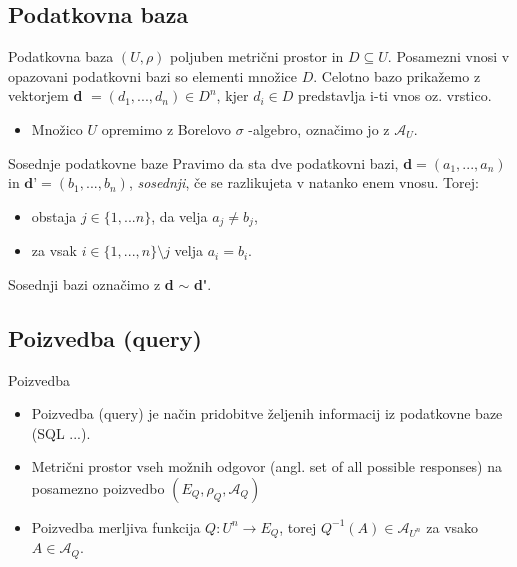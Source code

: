 \documentclass{beamer}
\begin{document}
\subsection{Podatkovna baza}
\begin{frame}{Podatkovna baza}
$(U, \rho)$ poljuben metrični prostor in $D \subseteq U$. Posamezni vnosi v opazovani podatkovni bazi so elementi množice $D$. Celotno bazo prikažemo z vektorjem \textbf{d} $= (d_{1}, ..., d_{n}) \in D^n$, kjer $d_{i} \in D$ predstavlja i-ti vnos oz. vrstico.
\newline
\newline
\begin{itemize}
\item Množico $U$ opremimo z Borelovo $\sigma$ -algebro, označimo jo z $\mathcal{A}_{U}$. 
\end{itemize}
\end{frame}

\begin{frame}{Sosednje podatkovne baze}
Pravimo da sta dve podatkovni bazi, \textbf{d}$= (a_{1},...,a_{n})$ in $\textbf{d'}= (b_{1},...,b_{n})$,  \textit{sosednji}, če se razlikujeta v natanko enem vnosu. Torej:
\begin{itemize}
\item obstaja $j\in\{1,...n\}$, da velja $a_{j} \neq b_{j}$,
\item za vsak $i\in\{1,...,n\} \setminus j$ velja $a_{i} = b_{i}$.
\end{itemize}
Sosednji bazi označimo z \textbf{d} $\sim$ \textbf{d\'}.
\end{frame}

\subsection{Poizvedba (query)}

\begin{frame}{Poizvedba}
\begin{itemize}
\item Poizvedba (query) je način pridobitve željenih informacij iz podatkovne baze (SQL ...).
\item Metrični prostor vseh možnih odgovor (angl. set of all possible responses) na posamezno poizvedbo  $(E_{Q}, \rho_{Q}, \mathcal{A}_{Q})$
\item  Poizvedba merljiva funkcija $Q: U^n \rightarrow E_{Q} $, torej $Q^{-1}(A) \in \mathcal{A}_{U^n}$ za vsako $A \in \mathcal{A}_Q$.
\end{itemize}
\end{frame}
\end{document}

